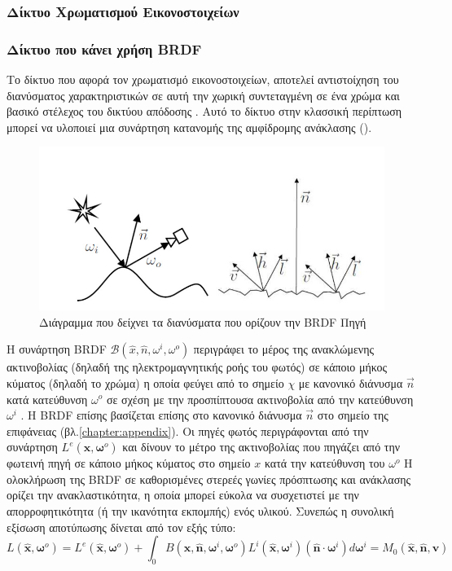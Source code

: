 \subsubsection{Δίκτυο Χρωματισμού Εικονοστοιχείων}
\subsubsection{Δίκτυο που κάνει χρήση BRDF \cite{matusik2003data}}
Το δίκτυο που αφορά τον χρωματισμό εικονοστοιχείων, αποτελεί αντιστοίχηση του διανύσματος χαρακτηριστικών σε αυτή την χωρική συντεταγμένη σε ένα χρώμα και βασικό στέλεχος του δικτύου απόδοσης . Αυτό το δίκτυο στην κλασσική περίπτωση μπορεί να υλοποιεί μια συνάρτηση κατανομής της αμφίδρομης ανάκλασης ().

\begin{figure}[ht]
    \centering
    \includegraphics[width=.4\linewidth]{images/chapter2_img/BRDF_Diagram.jpg}
    \caption{Διάγραμμα που δείχνει τα διανύσματα που ορίζουν την BRDF Πηγή \cite{6109209}}
    \label{fig:BRDF}
\end{figure}
Η συνάρτηση BRDF  $\mathcal{B}(\hat{x},\hat{n},\omega^i,\omega^o)$ περιγράφει το μέρος της ανακλώμενης ακτινοβολίας (δηλαδή της ηλεκτρομαγνητικής ροής του φωτός) σε κάποιο μήκος κύματος (δηλαδή το χρώμα) η οποία φεύγει από το σημείο $\chi$  με κανονικό διάνυσμα $\vec{n}$  κατά κατεύθυνση $\omega^o$  σε σχέση με την προσπίπτουσα ακτινοβολία από την κατεύθυνση $\omega^i$ . Η BRDF  επίσης βασίζεται επίσης στο κανονικό διάνυσμα $\vec{n}$ στο σημείο της επιφάνειας (βλ.\ref{chapter:appendix}). Οι πηγές φωτός περιγράφονται από την συνάρτηση $L^e\left(\hat{\boldsymbol{x}},\boldsymbol{\omega}^o\right)$  και δίνουν το μέτρο της ακτινοβολίας που πηγάζει από την φωτεινή πηγή σε κάποιο μήκος κύματος στο σημείο $x$ κατά την κατεύθυνση του $\omega^{o}$ 
Η ολοκλήρωση της BRDF σε καθορισμένες στερεές γωνίες πρόσπτωσης και ανάκλασης ορίζει την ανακλαστικότητα, η οποία μπορεί εύκολα να συσχετιστεί με την απορροφητικότητα (ή την ικανότητα εκπομπής) ενός υλικού. Συνεπώς η συνολική εξίσωση αποτύπωσης δίνεται από τον εξής τύπο: 
\begin{equation}
    L\left(\hat{\boldsymbol{x}},\boldsymbol{\omega}^o\right)=L^e\left(\hat{\boldsymbol{x}},\boldsymbol{\omega}^o\right)+\int_0 B\left(\hat{\boldsymbol{x}}, \hat{\boldsymbol{n}},\boldsymbol{\omega}^i,\boldsymbol{\omega}^o\right) L^i\left(\hat{\boldsymbol{x}},\boldsymbol{\omega}^i\right)\left(\hat{\boldsymbol{n}} \cdot\boldsymbol{\omega}^i\right) d\boldsymbol{\omega}^i=M_0(\hat{\boldsymbol{x}}, \hat{\boldsymbol{n}}, \boldsymbol{v})
    \label{eq:rendering}
\end{equation}

